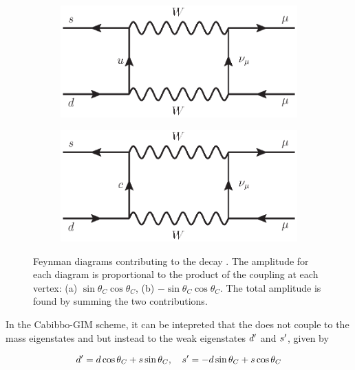 \begin{figure}[!tb]
\centering
\begin{subfigure}{0.49\textwidth}
\includegraphics[width=\linewidth]{figs/theory/KToMuMu_uquark.eps}
\caption{}
\label{fig:ktomm:a}
\end{subfigure}
\begin{subfigure}{0.49\textwidth}
\includegraphics[width=\linewidth]{figs/theory/KToMuMu_cquark.eps}
\caption{}
\label{fig:ktomm:b}
\end{subfigure}
\caption{Feynman diagrams contributing to the decay \decay{\Kz}{\mumu}. The amplitude for each diagram is proportional to the product of the coupling at each vertex: (a) $\sin\theta_{C}\cos\theta_{C}$, (b)  $-\sin\theta_{C}\cos\theta_{C}$. The total amplitude is found by summing the two contributions.}
\label{fig:ktomm}
\end{figure}

In the Cabibbo-GIM scheme, it can be intepreted that the \W does not couple to the mass eigenstates \dquark and \squark but instead to the weak eigenstates ${d}^\prime$ and ${s}^\prime$, given by

\begin{equation}
{\ensuremath{d}}^\prime = {d}\cos\theta_{C}+{s}\sin\theta_{C},~~~{s}^\prime = -{d}\sin\theta_{C}+{s}\cos\theta_{C}
\end{equation}

